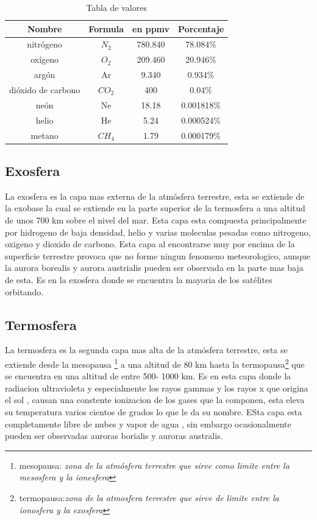 \documentclass{article}
\begin{document}
\begin{table}[htp]
\centering
\begin{tabular}{|c|c|c|c|}
\hline
Nombre & Formula & en ppmv & Porcentaje \\ \hline
nitrógeno & $N_2$ & 780.840 & 78.084\% \\ \hline
oxígeno & $O_2$ & 209.460 & 20.946\% \\ \hline
argón & Ar & 9.340 & 0.934\% \\ \hline
dióxido de carbono & $CO_2$ & 400 & 0.04\% \\ \hline
neón & Ne & 18.18 & 0.001818\% \\ \hline
helio & He & 5.24 & 0.000524\% \\ \hline
metano & $CH_4$ & 1.79 & 0.000179\% \\ \hline

\end{tabular}
\caption{Tabla de valores}
\label{Tabla 1}
\end{table}

\subsection{Exosfera}
La exosfera es la capa mas externa de la atmósfera terrestre, esta se extiende de la exobase la cual se extiende en la parte superior de la termosfera a una altitud de unos 700 km sobre el nivel del mar.
\newline
Esta capa esta compuesta principalmente por hidrogeno de baja densidad, helio y varias moleculas pesadas como nitrogeno, oxigeno y dioxido de carbono.
\newline
Esta capa al encontrarse muy por encima de la superficie terrestre provoca que no forme ningun fenomeno meteorologico, aunque la aurora borealis y aurora austrialis pueden ser observada en la parte mas baja de esta.
\newline
Es en la exosfera donde se encuentra la mayoria de los satélites orbitando.

\subsection{Termosfera}
La termosfera es la segunda capa mas alta de la atmósfera terrestre, esta se extiende desde la mesopausa \footnote {mesopausa: \textit{zona de la atmósfera terrestre que sirve como limite entre la mesosfera y la ionesfera}} a una altitud de 80 km hasta la termopausa\footnote {termopausa:\textit{zona de la atmosfera terrestre que sirve de limite entre la ionosfera y la exosfera}} que se encuentra en una altitud de entre 500- 1000 km.
\newline
Es en esta capa donde la radiacion ultravioleta y especialmente los rayos gammas y los rayos x que origina el sol , causan una constente ionizacion de los gases que la componen, esta eleva su temperatura varios cientos de grados lo que le da su nombre.
\newline
ESta capa esta completamente libre de nubes y vapor de agua , sin embargo ocasionalmente pueden ser observadas auroras borialis y auroras australis.
\end{document}
